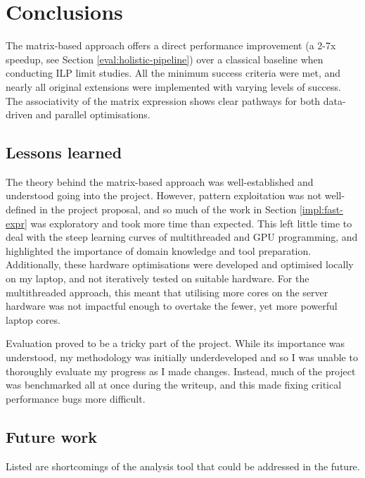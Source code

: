 \chapter{Conclusions}
\vspace{-10pt}
The matrix-based approach offers a direct performance improvement (a 2-7x speedup, see 
Section \ref{eval:holistic-pipeline}) over a classical baseline when conducting ILP limit studies.
All the minimum success criteria were met, and nearly all original extensions were 
implemented with varying levels of success. The associativity of the matrix expression shows
clear pathways for both data-driven and parallel optimisations.
\vspace{-10pt}
\section{Lessons learned}

The theory behind the matrix-based approach was well-established and understood going into the project.
However, pattern exploitation was not well-defined in the project proposal, and so much 
of the work in Section \ref{impl:fast-expr} was exploratory and took more time 
than expected. This left little time to deal with the steep learning curves of multithreaded and GPU programming, and 
highlighted the importance of domain knowledge and tool preparation. Additionally, these hardware optimisations were 
developed and optimised locally on my laptop, and not iteratively tested on suitable hardware. For the multithreaded
approach, this meant that utilising more cores on the server hardware was not impactful enough to overtake the fewer, 
yet more powerful laptop cores.

Evaluation proved to be a tricky part of the project. While its importance was understood, my methodology was 
initially underdeveloped and so I was unable to thoroughly evaluate my progress as I made changes.
Instead, much of the project was benchmarked all at once during the writeup, and this made fixing critical performance
bugs more difficult.
\vspace{-10pt}
\section{Future work}
\enlargethispage{2\baselineskip}

Listed are shortcomings of the analysis tool that could be addressed in the future.

